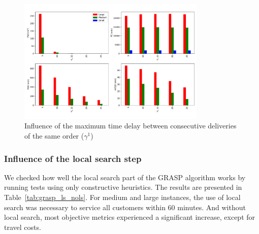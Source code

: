 \documentclass{article}
\begin{document}
\begin{figure}[!h]
    \centering
    \includegraphics[width=0.8\textwidth]{gamma1.pdf}
    \caption{Influence of the maximum time delay between consecutive deliveries of the same order ($\gamma^1$)}
    \label{fig:gamma1_influence}
\end{figure}

\subsubsection{Influence of the local search step}
We checked how well the local search part of the GRASP algorithm works by running tests using only constructive heuristics. The results are presented in Table~\ref*{tab:grasp_ls_nols}. For medium and large instances, the use of local search was necessary to service all customers within 60 minutes. And without local search, most objective metrics experienced a significant increase, except for travel costs.
\end{document}
